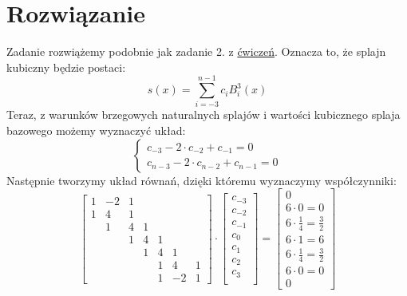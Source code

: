 \documentclass[a4paper]{article}
\begin{document}
   \section*{\large Rozwiązanie}

      Zadanie rozwiążemy podobnie jak zadanie 2.
      z \href{https://moodle.mimuw.edu.pl/pluginfile.php/117853/mod_resource/content/1/cw-08-splajny.pdf-pt2.pdf}{ćwiczeń}.
      Oznacza to, że splajn kubiczny będzie postaci:
      \[
         s(x) = \sum_{i=-3}^{n-1} c_{i} B_{i}^{3}(x)
      \]
      Teraz, z warunków brzegowych naturalnych splajów i wartości kubicznego splaja bazowego możemy wyznaczyć układ:
      \[
         \begin{cases}
            c_{-3} - 2 \cdot c_{-2} + c_{-1} = 0 \\
            c_{n-3} - 2 \cdot c_{n-2} + c_{n-1} = 0
         \end{cases}
      \]
      Następnie tworzymy układ równań, dzięki któremu wyznaczymy współczynniki:
      \[
         \begin{bmatrix}
            1 & -2 & 1 \\
            1 &  4 & 1 \\
              &  1 & 4 & 1 \\
              &    & 1 & 4 & 1 \\
              &    &   & 1 & 4 &  1 \\
              &    &   &   & 1 &  4 & 1 \\
              &    &   &   & 1 & -2 & 1
         \end{bmatrix}
         \cdot
         \begin{bmatrix}
            c_{-3} \\
            c_{-2} \\
            c_{-1} \\
            c_{0} \\
            c_{1} \\
            c_{2} \\
            c_{3} \\
         \end{bmatrix}
         =
         \begin{bmatrix}
            0 \\
            6 \cdot 0 = 0 \\
            6 \cdot \frac{1}{4} = \frac{3}{2} \\
            6 \cdot 1 = 6 \\
            6 \cdot \frac{1}{4} = \frac{3}{2} \\
            6 \cdot 0 = 0 \\
            0
         \end{bmatrix}
      \]
\end{document}
